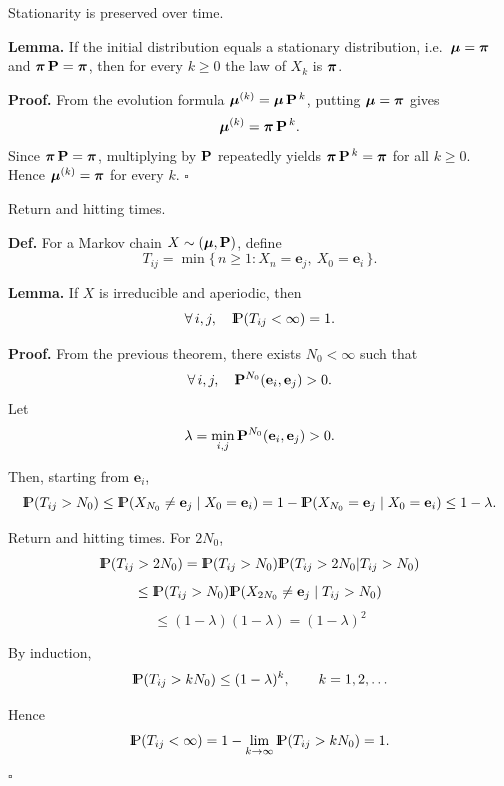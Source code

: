 \documentclass[aspectratio=169]{beamer}
\newcommand{\Prob}{{\rm I\hspace{-0.8mm}P}}
\newcommand{\e}[0]{\textbf{e}}
\begin{document}
\begin{frame}{Stationarity is preserved over time.}

\textbf{Lemma.}
If the initial distribution equals a stationary distribution, i.e.\ $\mbox{\boldmath $\mu$}=\mbox{\boldmath$\pi$}$ and $\mbox{\boldmath$\pi$}\,\mathbf{P}=\mbox{\boldmath$\pi$}$,
then for every $k\ge 0$ the law of $X_k$ is $\mbox{\boldmath$\pi$}$.

\bigskip
\textbf{Proof.}
From the evolution formula $\mbox{\boldmath $\mu$}^{(k)}=\mbox{\boldmath $\mu$}\,\mathbf{P}^{\,k}$, putting $\mbox{\boldmath $\mu$}=\mbox{\boldmath$\pi$}$ gives
\[
\mbox{\boldmath $\mu$}^{(k)}=\mbox{\boldmath$\pi$}\,\mathbf{P}^{\,k}.
\]
Since $\mbox{\boldmath$\pi$}\,\mathbf{P}=\mbox{\boldmath$\pi$}$, multiplying by $\mathbf{P}$ repeatedly yields
$\mbox{\boldmath$\pi$}\,\mathbf{P}^{\,k}=\mbox{\boldmath$\pi$}$ for all $k\ge 0$.
Hence $\mbox{\boldmath $\mu$}^{(k)}=\mbox{\boldmath$\pi$}$ for every $k$. \hfill$\square$

\end{frame}


\begin{frame}{Return and hitting times.}

\textbf{Def.}
For a Markov chain \(X\sim(\mbox{\boldmath $\mu$},\mathbf{P})\), define
\[
T_{ij} = \min\{\,n\ge1 : X_n = \e_j,\ X_0 = \e_i\,\}.
\]

\textbf{Lemma.}
If \(X\) is irreducible and aperiodic, then
\[
\forall\,i,j,\quad \Prob(T_{ij}<\infty)=1.
\]

\textbf{Proof.}
From the previous theorem, there exists \(N_0<\infty\) such that
\[
\forall\,i,j,\quad \bfP^{N_0}(\e_i,\e_j)>0.
\]
Let
\[
\lambda = \min_{i,j} \bfP^{N_0}(\e_i,\e_j) > 0.
\]

Then, starting from \(\e_i\),
\[
\Prob(T_{ij}>N_0) \leq  \Prob(X_{N_0}\neq \e_j \mid X_0=\e_i) = 1 - \Prob(X_{N_0}=\e_j \mid X_0=\e_i)
\le 1 - \lambda.
\]


\end{frame}




\begin{frame}{Return and hitting times.}
For \(2N_0\),
$$
\Prob(T_{ij}>2N_0)=\Prob(T_{ij}>N_0)\Prob(T_{ij}>2N_0|T_{ij}>N_0)
$$
$$
\leq \Prob(T_{ij}>N_0)\Prob(X_{2N_0}\neq\e_j\mid T_{ij}>N_0)
$$
$$\leq (1-\lambda)(1-\lambda)=(1-\lambda)^2
$$

\pause

By induction,
\[
\Prob(T_{ij}>kN_0) \le (1-\lambda)^k,
\qquad k=1,2,\ldots
\]

Hence
\[
\Prob(T_{ij}<\infty)
= 1 - \lim_{k\to\infty}\Prob(T_{ij}>kN_0)
= 1.
\]
\hfill$\square$

\end{frame}
\end{document}
